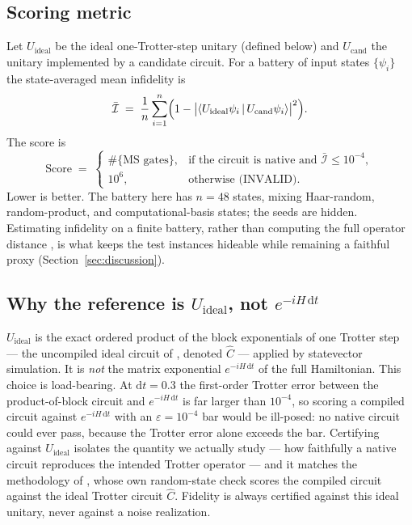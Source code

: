 \documentclass[11pt]{article}
\begin{document}
\subsection{Scoring metric}

Let $U_{\mathrm{ideal}}$ be the ideal one-Trotter-step unitary (defined below) and
$U_{\mathrm{cand}}$ the unitary implemented by a candidate circuit. For a battery of
input states $\{\psi_i\}$ the state-averaged mean infidelity is
\begin{equation}
\bar{\mathcal{I}} \;=\; \frac{1}{n}\sum_{i=1}^{n}
  \Bigl( 1 - \bigl|\langle U_{\mathrm{ideal}}\psi_i \,|\, U_{\mathrm{cand}}\psi_i
  \rangle\bigr|^{2} \Bigr).
\label{eq:infid}
\end{equation}
The score is
\begin{equation}
\mathrm{Score} \;=\;
\begin{cases}
  \#\{\text{MS gates}\}, & \text{if the circuit is native and }
    \bar{\mathcal{I}} \le 10^{-4},\\[2pt]
  10^{6}, & \text{otherwise (INVALID).}
\end{cases}
\label{eq:score}
\end{equation}
Lower is better. The battery here has $n=48$ states, mixing Haar-random,
random-product, and computational-basis states; the seeds are hidden. Estimating
infidelity on a finite battery, rather than computing the full operator distance
\cite{NielsenChuang2010}, is what keeps the test instances hideable while remaining
a faithful proxy (Section~\ref{sec:discussion}).

\subsection{Why the reference is \texorpdfstring{$U_{\mathrm{ideal}}$}{U\_ideal}, not
\texorpdfstring{$e^{-iH\,\mathrm{d}t}$}{exp(-iH dt)}}
\label{sec:uideal}

$U_{\mathrm{ideal}}$ is the exact ordered product of the block exponentials of one
Trotter step --- the uncompiled ideal circuit of \cite{Srinivasan2024}, denoted
$\hat{C}$ --- applied by statevector simulation. It is \emph{not} the matrix
exponential $e^{-iH\,\mathrm{d}t}$ of the full Hamiltonian. This choice is
load-bearing. At $\mathrm{d}t = 0.3$ the first-order Trotter error between the
product-of-block circuit and $e^{-iH\,\mathrm{d}t}$ is far larger than $10^{-4}$, so
scoring a compiled circuit against $e^{-iH\,\mathrm{d}t}$ with an $\varepsilon =
10^{-4}$ bar would be ill-posed: no native circuit could ever pass, because the
Trotter error alone exceeds the bar. Certifying against $U_{\mathrm{ideal}}$ isolates
the quantity we actually study --- how faithfully a native circuit reproduces the
intended Trotter operator --- and it matches the methodology of
\cite{Srinivasan2024}, whose own random-state check scores the compiled circuit
against the ideal Trotter circuit $\hat{C}$. Fidelity is always certified against
this ideal unitary, never against a noise realization.
\end{document}
